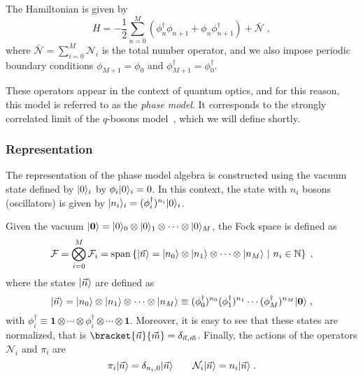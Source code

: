 \documentclass[a4paper,11pt]{amsart}
\begin{document}
The Hamiltonian is given by
\begin{equation}
  H = - \frac{1}{2} \sum_{n =0}^M \left(\phi_n^\dagger \phi_{n+1}
  + \phi_n \phi_{n+1}^\dagger \right) + \bar{\mathcal{N}}\; ,
\end{equation}
where \(\bar{\mathcal{N}} = \sum_{i=0}^M \mathcal{N}_i\) is the total
number operator, and we also impose periodic boundary conditions
\(\phi_{M+1} = \phi_0\) and \(\phi_{M+1}^\dagger = \phi_0^\dagger\).

These operators appear in the context of quantum optics, and for this
reason, this model is referred to as the \emph{phase model}. It corresponds to
the strongly correlated limit of the \(q\)-bosons
model~\cite{Bogoliubov:1997soj}, which we will define shortly.


\subsubsection{Representation}
The representation of the phase model algebra is constructed using
the vacuum state defined by \(\lvert0\rangle_i\) by \(\phi_i\lvert0\rangle_i =
0\). In this context, the state with \(n_i\) bosons (oscillators) is
given by \(\lvert n_i\rangle_i = (\phi_i^\dagger)^{n_i} \lvert0\rangle_i\).

Given the vacuum \(\lvert\bm{0}\rangle = \lvert0\rangle_0\otimes \lvert0\rangle_1
\otimes \cdots \otimes  \lvert0\rangle_M\), the Fock space is defined as 
\begin{equation}
  \mathcal{F} = \bigotimes_{i=0}^M \mathcal{F}_i = \mathrm{span}
  \left\{\lvert\vec{n}\rangle = \lvert n_0\rangle\otimes \lvert n_1\rangle \otimes \cdots
  \otimes \lvert n_M\rangle \ | \ n_i \in \mathbb{N} \right\}\; ,
\end{equation}
where the states \(\lvert\vec{n}\rangle\) are defined as 
\begin{equation}
  \lvert\vec{n}\rangle = \lvert n_0\rangle\otimes \lvert n_1\rangle \otimes \cdots \otimes \lvert n_M\rangle 
 \equiv  (\phi_0^\dagger)^{n_0} (\phi_1^\dagger)^{n_1} \cdots  (\phi_M^\dagger)^{n_M} \lvert\bm{0}\rangle \; ,
\end{equation}
with \(\phi_i^\dagger \equiv \bm{1} \otimes \cdots \otimes
\phi_i^\dagger \otimes \cdots \otimes \bm{1}\).  Moreover, it is easy
to see that these states are normalized, that is
\(\bracket{\vec{n}}{\vec{m}}=\delta_{\vec{n}, \vec{m}}\).  Finally,
the actions of the operators \(\mathcal{N}_i\) and \(\pi_i\) are
\begin{equation}
    \pi_i\lvert\vec{n}\rangle  = \delta_{n_i, 0} \lvert\vec{n}\rangle \qquad 
    \mathcal{N}_i\lvert\vec{n}\rangle = n_i \lvert\vec{n}\rangle\; .
\end{equation}
 
\end{document}
